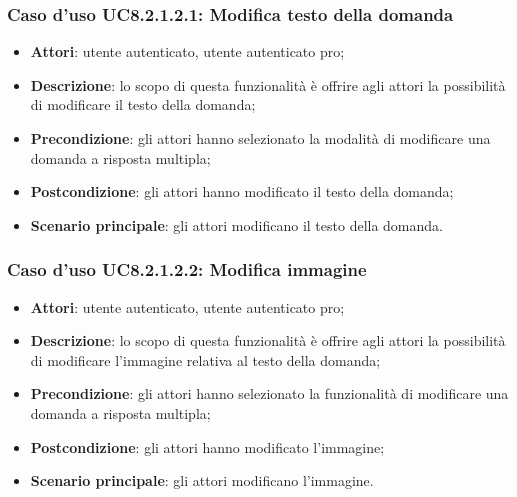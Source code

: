 \subsubsection{Caso d'uso UC8.2.1.2.1: Modifica testo della domanda}
	\begin{itemize}
		\item
			\textbf{Attori}: utente autenticato, utente autenticato pro;
		\item		
			\textbf{Descrizione}: lo scopo di questa funzionalità è offrire agli attori la possibilità di modificare il testo della domanda;
		\item
			\textbf{Precondizione}: gli attori hanno selezionato la modalità di modificare una domanda a risposta multipla; 
		\item
			\textbf{Postcondizione}: gli attori hanno modificato il testo della domanda;
		\item
			\textbf{Scenario principale}: gli attori modificano il testo della domanda. 
	 			
	\end{itemize}
	
\subsubsection{Caso d'uso UC8.2.1.2.2: Modifica immagine}
	\begin{itemize}
		\item
			\textbf{Attori}: utente autenticato, utente autenticato pro;
		\item		
			\textbf{Descrizione}: lo scopo di questa funzionalità è offrire agli attori la possibilità di modificare l'immagine relativa al testo della domanda;
		\item
			\textbf{Precondizione}: gli attori hanno selezionato la funzionalità di modificare una domanda a risposta multipla; 
		\item
			\textbf{Postcondizione}: gli attori hanno modificato l'immagine;
		\item
			\textbf{Scenario principale}: gli attori modificano l'immagine. 	
	\end{itemize}
	
	
